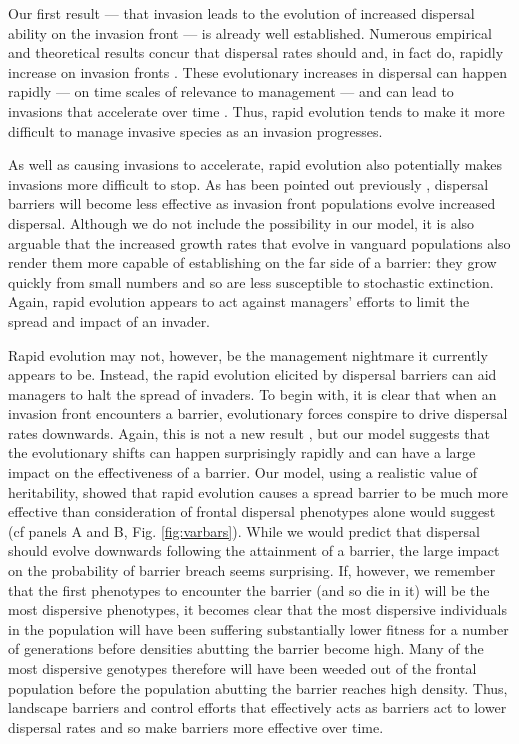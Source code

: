 \documentclass{article}
\begin{document}
Our first result --- that invasion leads to the evolution of increased dispersal ability on the invasion front --- is already well established.  Numerous empirical and theoretical results concur that dispersal rates should and, in fact do, rapidly increase on invasion fronts \citep[reviewed in][]{Phillips_Brown_Shine_2010}.  These evolutionary increases in dispersal can happen rapidly --- on time scales of relevance to management --- and can lead to invasions that accelerate over time \citep{Perkins_2012, Travis_Dytham_2002, Phillips_Brown_Travis_Shine_2008}.  Thus, rapid evolution tends to make it more difficult to manage invasive species as an invasion progresses.

As well as causing invasions to accelerate, rapid evolution also potentially makes invasions more difficult to stop.  As has been pointed out previously \citep{Travis_Smith_Ranwala_2010}, dispersal barriers will become less effective as invasion front populations evolve increased dispersal.  Although we do not include the possibility in our model, it is also arguable that the increased growth rates that evolve in vanguard populations \citep{Phillips_2009} also render them more capable of establishing on the far side of a barrier: they grow quickly from small numbers and so are less susceptible to stochastic extinction.  Again, rapid evolution appears to act against managers' efforts to limit the spread and impact of an invader.

Rapid evolution may not, however, be the management nightmare it currently appears to be.  Instead, the rapid evolution elicited by dispersal barriers can aid managers to halt the spread of invaders.  To begin with, it is clear that when an invasion front encounters a barrier, evolutionary forces conspire to drive dispersal rates downwards.  Again, this is not a new result \cite[e.g.,][]{Kubisch_Hovestadt_Poethke_2010, Phillips_2012}, but our model suggests that the evolutionary shifts can happen surprisingly rapidly and can have a large impact on the effectiveness of a barrier.  Our model, using a realistic value of heritability, showed that rapid evolution causes a spread barrier to be much more effective than consideration of frontal dispersal phenotypes alone would suggest (cf panels A and B, Fig. \ref{fig:varbars}).  While we would predict that dispersal should evolve downwards following the attainment of a barrier, the large impact on the probability of barrier breach seems surprising.  If, however, we remember that the first phenotypes to encounter the barrier (and so die in it) will be the most dispersive phenotypes, it becomes clear that the most dispersive individuals in the population will have been suffering substantially lower fitness for a number of generations before densities abutting the barrier become high.  Many of the most dispersive genotypes therefore will have been weeded out of the frontal population before the population abutting the barrier reaches high density.  Thus, landscape barriers and control efforts that effectively acts as barriers \citep[such as efforts to contain the spread of Gypsy Moth:][]{Sharov_1998} act to lower dispersal rates and so make barriers more effective over time.
\end{document}
